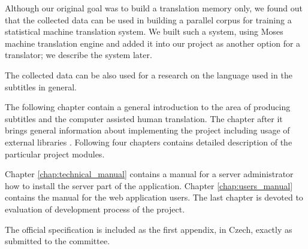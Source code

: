 Although our original goal was to build a translation memory only, we found out that the collected data can be used in building a parallel corpus for training a statistical machine translation system. We built such a system, using Moses machine translation engine and added it into our project as another option for a translator; we describe the system later.

The collected data can be also used for a research on the language used in the subtitles in general.

The following chapter contain a general introduction to the area of producing subtitles and the computer assisted human translation. The chapter after it brings general information about implementing the project including usage of external libraries . Following four chapters contains detailed description of the particular project modules.

Chapter \ref{chap:technical_manual} contains a manual for a server administrator how to install the server part of the application. Chapter \ref{chap:users_manual} contains the manual for the web application users. The last chapter is devoted to evaluation of development process of the project.

The official specification is included as the first appendix, in Czech, exactly as submitted to the committee.